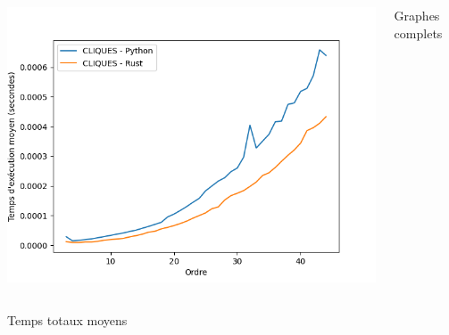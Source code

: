 \documentclass{beamer}
\begin{document}
\begin{frame}
\begin{columns}
    \includegraphics[width=\textwidth]{images/total_CLIQUES_new_pyrust_pivot_complete_plot.png}
    \caption{Graphes complets}
  \end{columns}
  \begin{center}
    Temps totaux moyens
  \end{center}
\end{frame}
\end{document}
